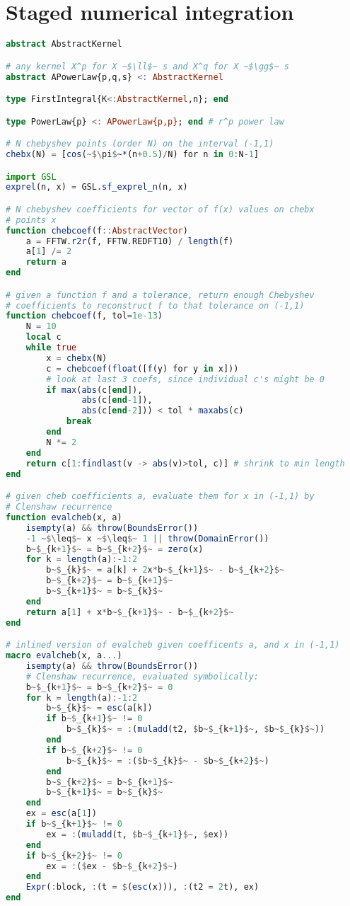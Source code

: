 \chapter{Staged numerical integration}
\label{appendix:integration}

\begin{singlespace}
\begin{lstlisting}[language=julia]
abstract AbstractKernel

# any kernel X^p for X ~$\ll$~ s and X^q for X ~$\gg$~ s
abstract APowerLaw{p,q,s} <: AbstractKernel

type FirstIntegral{K<:AbstractKernel,n}; end

type PowerLaw{p} <: APowerLaw{p,p}; end # r^p power law

# N chebyshev points (order N) on the interval (-1,1)
chebx(N) = [cos(~$\pi$~*(n+0.5)/N) for n in 0:N-1]

import GSL
exprel(n, x) = GSL.sf_exprel_n(n, x)

# N chebyshev coefficients for vector of f(x) values on chebx
# points x
function chebcoef(f::AbstractVector)
    a = FFTW.r2r(f, FFTW.REDFT10) / length(f)
    a[1] /= 2
    return a
end

# given a function f and a tolerance, return enough Chebyshev
# coefficients to reconstruct f to that tolerance on (-1,1)
function chebcoef(f, tol=1e-13)
    N = 10
    local c
    while true
        x = chebx(N)
        c = chebcoef(float([f(y) for y in x]))
        # look at last 3 coefs, since individual c's might be 0
        if max(abs(c[end]),
               abs(c[end-1]),
               abs(c[end-2])) < tol * maxabs(c)
            break
        end
        N *= 2
    end
    return c[1:findlast(v -> abs(v)>tol, c)] # shrink to min length
end

# given cheb coefficients a, evaluate them for x in (-1,1) by
# Clenshaw recurrence
function evalcheb(x, a)
    isempty(a) && throw(BoundsError())
    -1 ~$\leq$~ x ~$\leq$~ 1 || throw(DomainError())
    b~$_{k+1}$~ = b~$_{k+2}$~ = zero(x)
    for k = length(a):-1:2
        b~$_{k}$~ = a[k] + 2x*b~$_{k+1}$~ - b~$_{k+2}$~
        b~$_{k+2}$~ = b~$_{k+1}$~
        b~$_{k+1}$~ = b~$_{k}$~
    end
    return a[1] + x*b~$_{k+1}$~ - b~$_{k+2}$~
end

# inlined version of evalcheb given coefficents a, and x in (-1,1)
macro evalcheb(x, a...)
    isempty(a) && throw(BoundsError())
    # Clenshaw recurrence, evaluated symbolically:
    b~$_{k+1}$~ = b~$_{k+2}$~ = 0
    for k = length(a):-1:2
        b~$_{k}$~ = esc(a[k])
        if b~$_{k+1}$~ != 0
            b~$_{k}$~ = :(muladd(t2, $b~$_{k+1}$~, $b~$_{k}$~))
        end
        if b~$_{k+2}$~ != 0
            b~$_{k}$~ = :($b~$_{k}$~ - $b~$_{k+2}$~)
        end
        b~$_{k+2}$~ = b~$_{k+1}$~
        b~$_{k+1}$~ = b~$_{k}$~
    end
    ex = esc(a[1])
    if b~$_{k+1}$~ != 0
        ex = :(muladd(t, $b~$_{k+1}$~, $ex))
    end
    if b~$_{k+2}$~ != 0
        ex = :($ex - $b~$_{k+2}$~)
    end
    Expr(:block, :(t = $(esc(x))), :(t2 = 2t), ex)
end


\end{lstlisting}
\end{singlespace}
